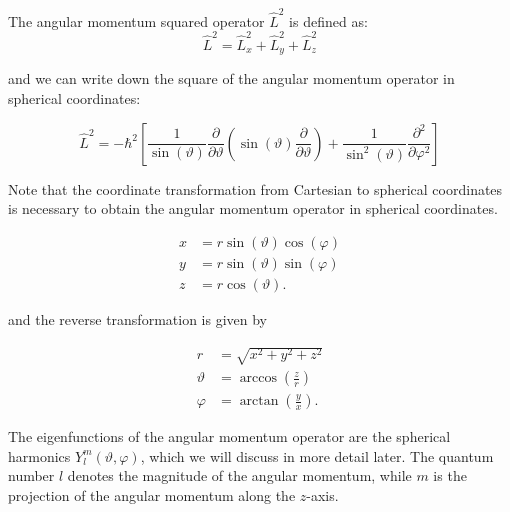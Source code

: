 \documentclass[
  a4paper,
]{book}
\begin{document}
The angular momentum squared operator \(\hat{L}^2\) is defined as: \[
\hat{L}^2 = \hat{L}_x^2 + \hat{L}_y^2 + \hat{L}_z^2
\]

and we can write down the square of the angular momentum operator in
spherical coordinates:

\[
\hat{L}^2 = -\hbar^2\left[\frac{1}{\sin \left( \vartheta \right)} \frac{\partial}{\partial \vartheta}
\left( \sin \left( \vartheta \right) \frac{\partial}{\partial \vartheta} \right) +
\frac{1}{\sin^2 \left( \vartheta \right)} \frac{\partial^2}{\partial \varphi^2}\right]
\]

\begin{tcolorbox}[enhanced jigsaw, coltitle=black, title=\textcolor{quarto-callout-note-color}{\faInfo}\hspace{0.5em}{Note}, colframe=quarto-callout-note-color-frame, toprule=.15mm, opacitybacktitle=0.6, left=2mm, opacityback=0, breakable, toptitle=1mm, bottomtitle=1mm, leftrule=.75mm, arc=.35mm, titlerule=0mm, colbacktitle=quarto-callout-note-color!10!white, rightrule=.15mm, bottomrule=.15mm, colback=white]

Note that the coordinate transformation from Cartesian to spherical
coordinates is necessary to obtain the angular momentum operator in
spherical coordinates.

\[
\begin{aligned}
x & =  r \sin \left( \vartheta \right) \cos \left( \varphi \right)\\
y & =  r \sin \left( \vartheta \right) \sin \left( \varphi \right)\\
z & =  r \cos \left( \vartheta \right) \mathrm{.}
\end{aligned}
\]

and the reverse transformation is given by

\[
\begin{aligned}
r & =  \sqrt{x^2 + y^2 + z^2}\\
\vartheta & =  \arccos \left( \frac{z}{r} \right)\\
\varphi & =  \arctan \left( \frac{y}{x} \right) \mathrm{.}
\end{aligned}
\]

\end{tcolorbox}

The eigenfunctions of the angular momentum operator are the spherical
harmonics \(Y_l^m \left( \vartheta, \varphi \right)\), which we will
discuss in more detail later. The quantum number \(l\) denotes the
magnitude of the angular momentum, while \(m\) is the projection of the
angular momentum along the \(z\)-axis.
\end{document}
